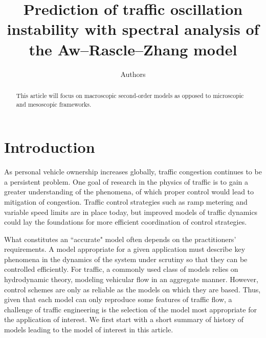 \documentclass[preprint]{elsarticle}
\begin{document}
\begin{frontmatter}

\title{Prediction of traffic oscillation instability with spectral analysis of the Aw--Rascle--Zhang model}

\author[add]{Authors}
\address[add]{address}
%
%
%

\begin{abstract}
This article will focus on macroscopic second-order models as opposed
to microscopic and mesoscopic frameworks.
\end{abstract}

\begin{keyword}

\end{keyword}

\end{frontmatter}


\section{Introduction}

As personal vehicle ownership increases globally, traffic congestion
continues to be a persistent problem. One goal of research in the physics of traffic is to gain a greater understanding of the phenomena, of which proper control would lead to mitigation of congestion. Traffic control strategies such as
ramp metering and variable speed limits are in place today, but improved models of traffic dynamics could lay the foundations for more efficient coordination of
control strategies. 

What constitutes an ``accurate" model often depends on the practitioners' requirements. A model appropriate for a given application must describe key phenomena in the dynamics of the system under scrutiny so that they can be controlled efficiently. For traffic, a commonly used class of models relies on hydrodynamic theory, modeling vehicular flow in an aggregate manner. However, control schemes are only as reliable as the models on which they are based. Thus, given that each model can only reproduce some features of traffic flow, a challenge of traffic engineering is the selection of the model most appropriate for the application of interest. We first start with a short summary of history of models leading to the model of interest in this article.
\end{document}
